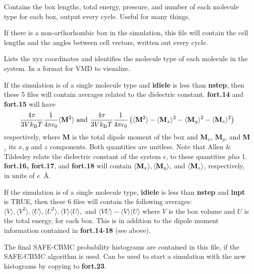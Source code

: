 \documentclass[12pt,letterpaper]{article}
\begin{document}
 Contains the box lengths, total
energy, pressure, and number of each molecule type for each
box, output every cycle. Useful for many things.

 If there is a
non-orthorhombic box in the simulation, this file will
contain the cell lengths and the angles between cell
vectors, written out every cycle.

 Lists the xyz coordinates
and identifies the molecule type of each molecule in the
system. In a format for VMD to visualize.

If the simulation is of a single molecule type and {\bf
  idiele} is less than {\bf nstep}, then these 5 files will
contain averages related to the dielectric constant. {\bf
  fort.14} and {\bf fort.15} will have
\begin{equation}
\frac{4\pi}{3Vk_{\rm B}T} \frac{1}{4\pi\epsilon_0}
\langle {\bf M}^2\rangle
\text{  and  }
\frac{4\pi}{3Vk_{\rm B}T}\frac{1}{4\pi\epsilon_0}
\left(\langle {\bf M}^2\rangle -
\langle {\bf M}_x\rangle^2 -
\langle{\bf M}_y\rangle^2 -
\langle{\bf M}_z\rangle^2 \right)
\end{equation}
respectively, where {\bf M} is the total dipole moment of
the box and {\bf M}$_x$, {\bf M}$_y$, and {\bf M}$_z$ its
$x, y$ and $z$ components. Both quantities are unitless.
Note that Allen \& Tildesley relate the dielectric constant
of the system $\epsilon$, to these quantities {\sl plus} 1.
{\bf fort.16, fort.17}, and {\bf fort.18} will contain
$\langle{\bf M}_x\rangle, \langle{\bf M}_y\rangle,$ and
$\langle{\bf M}_z\rangle$, respectively, in units of
$e$~\AA.

If the simulation is of a single molecule type, {\bf idiele} is less
than {\bf nstep} and {\bf lnpt} is TRUE, then these 6 files will
contain the following averages: $\langle V\rangle, \langle V^2
\rangle, \langle U \rangle, \langle U^2\rangle, \langle V
\rangle\langle U \rangle,$ and $\langle VU \rangle - \langle V \rangle
\langle U \rangle$ where $V$ is the box volume and $U$ is the total
energy, for each box.  This is in addition to the dipole moment
information contained in {\bf fort.14}-{\bf 18} (see above).

 The final SAFE-CBMC probability
histograms are contained in this file, if the SAFE-CBMC
algorithm is used. Can be used to start a simulation with
the new histograms by copying to {\bf fort.23}.
\end{document}

